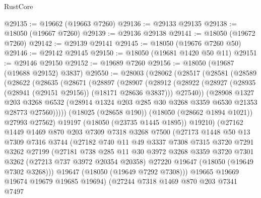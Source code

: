 \begin{lexlean}{RustCore}
\begin{coremodule}
@29135 := @19662 (@19663 @7260)
@29136 := @29133 @29135
@29138 := @18050 (@19667 @7260)
@29139 := @29136 @29138
@29141 := @18050 (@19672 @7260)
@29142 := @29139 @29141
@29145 := @18050 (@19676 @7260 @50)
@29146 := @29142 @29145
@29150 := @18050 (@19681 @1420 @50 @11)
@29151 := @29146 @29150
@29152 := @19689 @7260
@29156 := @18050 (@19687 (@19688 @29152) @3837)
@29550 := @28003
    (@28062
      (@28517
        (@28581
          (@28589
            (@28622
              (@28635
                (@28671
                  (@28897
                    (@28907
                      (@28912
                        (@28922
                          (@28927 (@28935 (@28941 (@29151 @29156)) (@18171 @28636 @3837)))
                          @27540))
                      (@28908
                        @1327
                        @203
                        @3268
                        @6532
                        (@28914 @1324 @203 @285 @30 @3268 @3359 @6530 @21353 @28773 @27560)))))
                (@18025 (@28658 @190))
                (@18050 (@28662 @1894 @1021))
                @27993
                @27562)
              @19197
              (@18050 (@23735 @1445 @1895))
              @19210)
            (@27162
              @1449
              @1469
              @870
              @203
              @7309
              @7318
              @3268
              @7500
              (@27173
                @1448
                @50
                @13
                @7309
                @7316
                @3744
                (@27182
                  @740
                  @11
                  @49
                  @3337
                  @7308
                  @7315
                  @3720
                  @7291
                  @3262
                  @27199
                  (@27181
                    @738
                    @285
                    @11
                    @30
                    @3972
                    @3268
                    @3359
                    @3720
                    @7301
                    @3262
                    (@27213 @737 @3972 @20354 @20358)
                    @27220
                    @19647
                    (@18050 (@19649 @7302 @3268)))
                  @19647
                  (@18050 (@19649 @7292 @7308)))
                @19665
                @19669
                @19674
                @19679
                @19685
                @19694)
              (@27244
                @7318
                @1469
                @870
                @203
                @7341
                @7497

\end{coremodule}
\end{lexlean}
